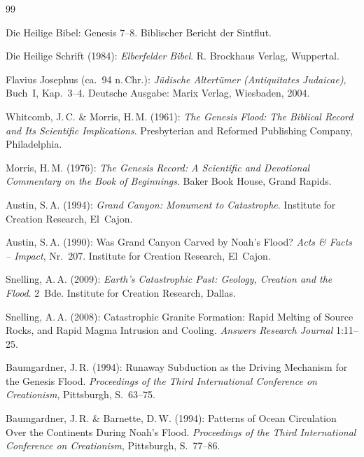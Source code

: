﻿\documentclass[12pt,a4paper]{report}
\begin{document}
\begin{thebibliography}{99}


Die Heilige Bibel: Genesis 7--8. Biblischer Bericht der Sintflut.

Die Heilige Schrift (1984): \textit{Elberfelder Bibel}. R. Brockhaus Verlag, Wuppertal.

Flavius Josephus (ca.\ 94 n.\,Chr.): \textit{Jüdische Altertümer (Antiquitates Judaicae)}, Buch~I, Kap.\ 3--4. Deutsche Ausgabe: Marix Verlag, Wiesbaden, 2004.


Whitcomb, J.\,C. \& Morris, H.\,M. (1961): \textit{The Genesis Flood: The Biblical Record and Its Scientific Implications}. Presbyterian and Reformed Publishing Company, Philadelphia.

Morris, H.\,M. (1976): \textit{The Genesis Record: A Scientific and Devotional Commentary on the Book of Beginnings}. Baker Book House, Grand Rapids.

Austin, S.\,A. (1994): \textit{Grand Canyon: Monument to Catastrophe}. Institute for Creation Research, El~Cajon.

Austin, S.\,A. (1990): Was Grand Canyon Carved by Noah's Flood? \textit{Acts \& Facts -- Impact}, Nr.\ 207. Institute for Creation Research, El~Cajon.

Snelling, A.\,A. (2009): \textit{Earth's Catastrophic Past: Geology, Creation and the Flood}. 2~Bde. Institute for Creation Research, Dallas.

Snelling, A.\,A. (2008): Catastrophic Granite Formation: Rapid Melting of Source Rocks, and Rapid Magma Intrusion and Cooling. \textit{Answers Research Journal} 1:11--25.

Baumgardner, J.\,R. (1994): Runaway Subduction as the Driving Mechanism for the Genesis Flood. \textit{Proceedings of the Third International Conference on Creationism}, Pittsburgh, S.\ 63--75.

Baumgardner, J.\,R. \& Barnette, D.\,W. (1994): Patterns of Ocean Circulation Over the Continents During Noah's Flood. \textit{Proceedings of the Third International Conference on Creationism}, Pittsburgh, S.\ 77--86.


\end{thebibliography}
\end{document}
